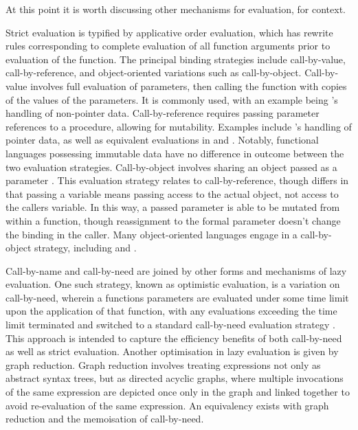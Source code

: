 At this point it is worth discussing other mechanisms for evaluation, for context.

Strict evaluation is typified by applicative order evaluation, which has rewrite rules corresponding to complete evaluation of all function arguments prior to evaluation of the function\cite{abelson1996sicp:order}.
The principal binding strategies include call-by-value, call-by-reference, and object-oriented variations such as call-by-object.
Call-by-value involves full evaluation of parameters, then calling the function with copies of the values of the parameters\cite{plotkin1975callnameval}.
It is commonly used, with an example being 's handling of non-pointer data.
Call-by-reference requires passing parameter references to a procedure, allowing for mutability\cite{turbak2008design}.
Examples include 's handling of pointer data, as well as equivalent evaluations in  and .
Notably, functional languages possessing immutable data have no difference in outcome between the two evaluation strategies.
Call-by-object involves sharing an object passed as a parameter \cite{liskov1979clu}.
This evaluation strategy relates to call-by-reference, though differs in that passing a variable means passing access to the actual object, not access to the callers variable.
In this way, a passed parameter is able to be mutated from within a function, though reassignment to the formal parameter doesn't change the binding in the caller.
Many object-oriented languages engage in a call-by-object strategy, including  and .

Call-by-name and call-by-need are joined by other forms and mechanisms of lazy evaluation.
One such strategy, known as optimistic evaluation, is a variation on call-by-need, wherein a functions parameters are evaluated under some time limit upon the application of that function, with any evaluations exceeding the time limit terminated and switched to a standard call-by-need evaluation strategy \cite{ennals2003optimistic}.
This approach is intended to capture the efficiency benefits of both call-by-need as well as strict evaluation.
Another optimisation in lazy evaluation is given by graph reduction.
Graph reduction involves treating expressions not only as abstract syntax trees, but as directed acyclic graphs, where multiple invocations of the same expression are depicted once only in the graph and linked together to avoid re-evaluation of the same expression\cite{hudak1989functional}.
An equivalency exists with graph reduction and the memoisation of call-by-need.

